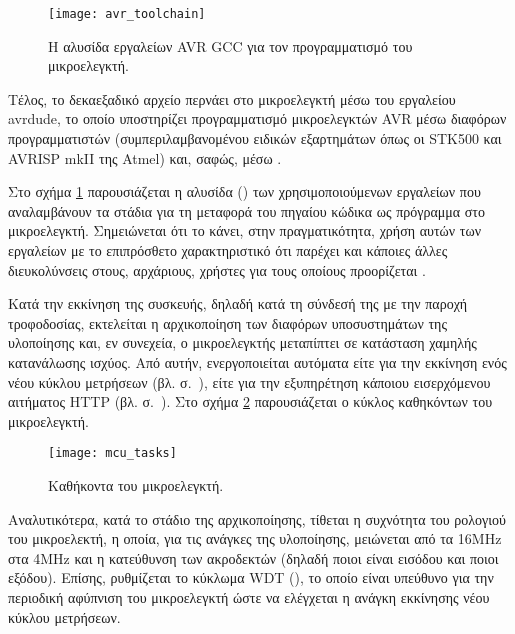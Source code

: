 \begin{figure}
    \caption{Η αλυσίδα εργαλείων AVR GCC για τον προγραμματισμό του
    μικροελεγκτή.\label{fig:avr:toolchain}}
    \begin{center}
    \texttt{[image: avr\_toolchain]}
    \end{center}
\end{figure}

Τέλος, το δεκαεξαδικό αρχείο περνάει στο μικροελεγκτή μέσω του εργαλείου
avrdude, το
οποίο υποστηρίζει προγραμματισμό μικροελεγκτών AVR μέσω διαφόρων προγραμματιστών
(συμπεριλαμβανομένου ειδικών εξαρτημάτων όπως οι STK500 και AVRISP mkII της
Atmel) και, σαφώς, μέσω  \parencites[15]{avrlibc}{avrdude}.

Στο σχήμα \ref{fig:avr:toolchain} παρουσιάζεται η αλυσίδα () των
χρησιμοποιούμενων εργαλείων που αναλαμβάνουν τα στάδια για τη μεταφορά του
πηγαίου κώδικα ως πρόγραμμα στο μικροελεγκτή. Σημειώνεται ότι το  κάνει, στην πραγματικότητα, χρήση αυτών των εργαλείων με το επιπρόσθετο
χαρακτηριστικό ότι παρέχει και κάποιες άλλες διευκολύνσεις στους, αρχάριους,
χρήστες για τους οποίους προορίζεται \parencite{arduino:build}.


Κατά την εκκίνηση της συσκευής, δηλαδή κατά τη σύνδεσή της με την παροχή
τροφοδοσίας, εκτελείται η αρχικοποίηση των διαφόρων υποσυστημάτων της υλοποίησης
και, εν συνεχεία, ο μικροελεγκτής μεταπίπτει σε κατάσταση χαμηλής κατανάλωσης
ισχύος. Από αυτήν, ενεργοποιείται αυτόματα είτε για την εκκίνηση ενός νέου
κύκλου μετρήσεων (βλ.  σ.~\pageref{sec:task}), είτε για την
εξυπηρέτηση κάποιου εισερχόμενου αιτήματος HTTP (βλ.  σ.~\pageref{sec:network:impl-resources}). Στο σχήμα
\ref{fig:mcu:tasks} παρουσιάζεται ο κύκλος καθηκόντων του μικροελεγκτή.

\begin{figure}
    \caption{Καθήκοντα του μικροελεγκτή.\label{fig:mcu:tasks}}
    \begin{center}
    \texttt{[image: mcu\_tasks]}
    \end{center}
\end{figure}

Αναλυτικότερα, κατά το στάδιο της αρχικοποίησης, τίθεται η συχνότητα του
ρολογιού του μικροελεκτή, η οποία, για τις ανάγκες της υλοποίησης, μειώνεται από
τα 16MHz στα 4MHz και η κατεύθυνση των ακροδεκτών (δηλαδή ποιοι είναι εισόδου
και ποιοι εξόδου). Επίσης, ρυθμίζεται το κύκλωμα WDT (), το
οποίο είναι υπεύθυνο για την περιοδική αφύπνιση του μικροελεγκτή ώστε να
ελέγχεται η ανάγκη εκκίνησης νέου κύκλου μετρήσεων.

